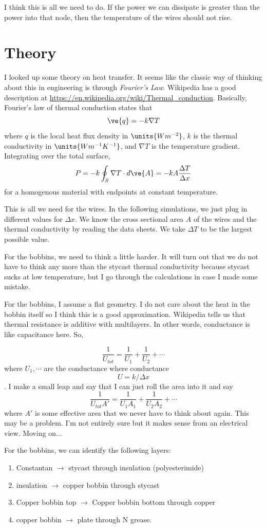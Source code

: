 \documentclass[10pt,twocolumn,aps,rmp,tightenlines,reprint]{revtex4-1}
\begin{document}
I think this is all we need to do.  If the power we can dissipate is
greater than the power into that node, then the temperature of the wires 
should not rise.

\section{Theory}
I looked up some theory on heat transfer.  It seems like the classic way
of thinking about this in engineering is through \emph{Fourier's Law}.  
Wikipedia has a good description at 
\url{https://en.wikipedia.org/wiki/Thermal_conduction}.  Basically,
Fourier's law of thermal conduction states that 
\[\ve{q} = -k\nabla T\]
where \(q\) is the local heat flux density in \(\units{W m^{-2}}\), \(k\) 
is the thermal conductivity in \(\units{Wm^{-1}K^{-1}}\), and \(\nabla T\) 
is the temperature gradient.  Integrating over the total surface, 
\[P = -k \oint_S \nabla T \cdot d\ve{A} = -kA \frac{\Delta T}{\Delta x}\]
for a homogenous material with endpoints at constant temperature.

This is all we need for the wires.  In the following simulations, we just
plug in different values for \(\Delta x\).  We know the cross sectional 
area \(A\) of the wires and the thermal conductivity by reading the 
data sheets.  We take \(\Delta T\) to be the largest possible value.

For the bobbins, we need to think a little harder.  It will turn out
that we do not have to think any more than the stycast thermal conductivity
because stycast sucks at low temperature, but I go through the 
calculations in case I made some mistake.

For the bobbins, I assume a flat geometry.  I do not care about the heat
in the bobbin itself so I think this is a good approximation.  Wikipedia 
tells us that thermal resistance is additive with multilayers.  In other
words, conductance is like capacitance here.  So,

\[\frac{1}{U_{tot}} = \frac{1}{U_1} + \frac{1}{U_2} + \cdots\]
where \(U_1,\cdots\) are the conductance where conductance 
\[U = k/\Delta x\].  I make a small leap and say that I can just roll
the area into it and say
\[\frac{1}{U_{tot}A'} = \frac{1}{U_1A_1} + \frac{1}{U_2A_2} + \cdots\]
where \(A'\) is some effective area that we never have to think about 
again.  This may be a problem.  I'm not entirely sure but it makes 
sense from an electrical view.  Moving on...

For the bobbins, we can identify the following layers:
\begin{enumerate}
    \item Constantan \(\to\) stycast through insulation (polyesterimide) 
    \item insulation \(\to\) copper bobbin through stycast 
    \item Copper bobbin top \(\to\) Copper bobbin bottom through copper
    \item copper bobbin \(\to\) plate through N grease.
\end{enumerate}
\end{document}
